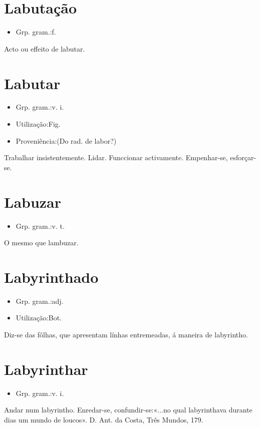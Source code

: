 \section{Labutação}
\begin{itemize}
\item {Grp. gram.:f.}
\end{itemize}
Acto ou effeito de labutar.
\section{Labutar}
\begin{itemize}
\item {Grp. gram.:v. i.}
\end{itemize}
\begin{itemize}
\item {Utilização:Fig.}
\end{itemize}
\begin{itemize}
\item {Proveniência:(Do rad. de \textunderscore labor\textunderscore ?)}
\end{itemize}
Trabalhar insistentemente.
Lidar.
Funccionar activamente.
Empenhar-se, esforçar-se.
\section{Labuzar}
\begin{itemize}
\item {Grp. gram.:v. t.}
\end{itemize}
O mesmo que \textunderscore lambuzar\textunderscore .
\section{Labyrinthado}
\begin{itemize}
\item {Grp. gram.:adj.}
\end{itemize}
\begin{itemize}
\item {Utilização:Bot.}
\end{itemize}
Diz-se das fôlhas, que apresentam línhas entremeadas, á maneira de labyrintho.
\section{Labyrinthar}
\begin{itemize}
\item {Grp. gram.:v. i.}
\end{itemize}
Andar num labyrintho.
Enredar-se, confundir-se:«\textunderscore ...no qual labyrinthava durante dias um mundo de loucos\textunderscore ». D. Ant. da Costa, \textunderscore Três Mundos\textunderscore , 179.
